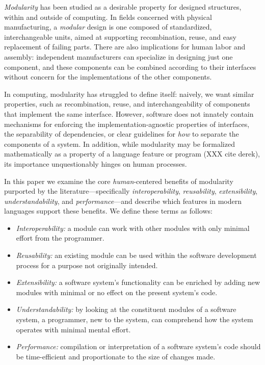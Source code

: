 \documentclass{sigplanconf}[10pt]
\begin{document}
{\em Modularity} has been studied as a desirable property for designed
structures, within and outside of computing. In fields concerned with
physical manufacturing, a {\em modular} design is one composed of
standardized, interchangeable units, aimed at supporting recombination,
reuse, and easy replacement of failing parts. There are also implications
for human labor and assembly: independent manufacturers can specialize in
designing just one component, and these components can be combined
according to their interfaces without concern for the implementations of
the other components.  

In computing, modularity has struggled to define itself: naively, we want
similar properties, such as recombination, reuse, and interchangeability of
components that implement the same interface. However, software does not
innately contain mechanisms for enforcing the implementation-agnostic
properties of interfaces, the separability of dependencies, or clear
guidelines for {\em how} to separate the components of a system.  In addition, while
modularity may be formalized mathematically as a property of a language
feature or program (XXX cite derek), its importance unquestionably hinges
on human processes. 

In this paper we examine the core {\em human}-centered benefits of
modularity purported by the literature---specifically {\em
interoperability}, {\em reusability}, {\em extensibility}, {\em understandability},
and {\em performance}---and describe which features in modern languages
support these benefits. 
We define these terms as follows:

\begin{itemize}
  \item {\em Interoperability:} a module can work with other modules 
  with only minimal effort from the programmer.
  \item {\em Reusability:} an existing module can be used within the software
    development process for a purpose not originally intended.
  \item {\em Extensibility:} a software system's functionality can be enriched
    by adding new modules with minimal or no effect on the present system's 
    code.
  \item {\em Understandability:} by looking at the constituent modules of a 
    software system, a programmer, new to the system, can comprehend how 
    the system operates with minimal mental effort.
  \item {\em Performance:} compilation or interpretation of a software system's
    code should be time-efficient and proportionate to the size of changes made.
\end{itemize}
\end{document}
